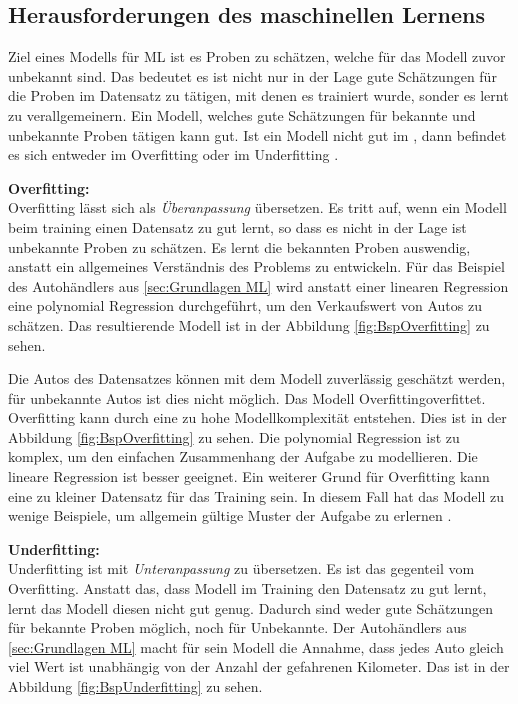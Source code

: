 \subsection{Herausforderungen des maschinellen Lernens}
Ziel eines Modells für \gls{ML} ist es Proben zu schätzen, welche für das Modell zuvor unbekannt sind. Das bedeutet es ist nicht nur in der Lage gute Schätzungen für die Proben im Datensatz zu tätigen, mit denen es trainiert wurde, sonder es lernt zu verallgemeinern. Ein Modell, welches gute Schätzungen für bekannte und unbekannte Proben tätigen kann  gut. Ist ein Modell nicht gut im , dann befindet es sich entweder im \gls{Overfitting} oder im \gls{Underfitting} \cite{Burkov.2019}.

\textbf{\gls{Overfitting}:}\\
\gls{Overfitting} lässt sich als \textit{Überanpassung} übersetzen. Es tritt auf, wenn ein Modell beim training einen Datensatz zu gut lernt, so dass es nicht in der Lage ist unbekannte Proben zu schätzen. Es lernt die bekannten Proben auswendig, anstatt ein allgemeines Verständnis des Problems zu entwickeln. Für das Beispiel des Autohändlers aus \ref{sec:Grundlagen ML} wird anstatt einer linearen Regression eine polynomial Regression durchgeführt, um den Verkaufswert von Autos zu schätzen. Das resultierende Modell ist in der Abbildung \ref{fig:BspOverfitting} zu sehen.


Die Autos des Datensatzes können mit dem Modell zuverlässig geschätzt werden, für unbekannte Autos ist dies nicht möglich. Das Modell \gls{Overfitting}{overfittet}. \gls{Overfitting} kann durch eine zu hohe Modellkomplexität entstehen. Dies ist in der Abbildung \ref{fig:BspOverfitting} zu sehen. Die polynomial Regression ist zu komplex, um den einfachen Zusammenhang der Aufgabe zu modellieren. Die lineare Regression ist besser geeignet. Ein weiterer Grund für \gls{Overfitting} kann eine zu kleiner Datensatz für das Training sein. In diesem Fall hat das Modell zu wenige Beispiele, um allgemein gültige Muster der Aufgabe zu erlernen \cite{Burkov.2019, Bishop.2006, Goodfellow.2016}.\par

\textbf{\gls{Underfitting}:}\\
\gls{Underfitting} ist mit \textit{Unteranpassung} zu übersetzen. Es ist das gegenteil vom \gls{Overfitting}. Anstatt das, dass Modell im Training den Datensatz zu gut lernt, lernt das Modell diesen nicht gut genug. Dadurch sind weder gute Schätzungen für bekannte Proben möglich, noch für Unbekannte. Der Autohändlers aus \ref{sec:Grundlagen ML} macht für sein Modell die Annahme, dass jedes Auto gleich viel Wert ist unabhängig von der Anzahl der gefahrenen Kilometer. Das ist in der Abbildung \ref{fig:BspUnderfitting} zu sehen.


